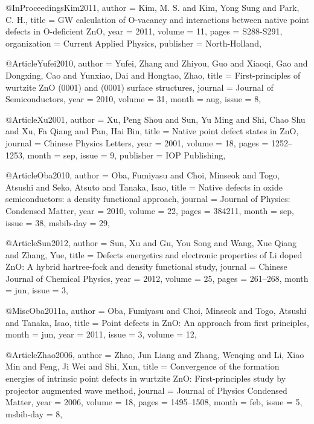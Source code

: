 @InProceedings{Kim2011,
  author       = {Kim, M. S. and Kim, Yong Sung and Park, C. H.},
  title        = {GW calculation of O-vacancy and interactions between native point defects in O-deficient ZnO},
  year         = {2011},
  volume       = {11},
  pages        = {S288-S291},
  organization = {Current Applied Physics},
  publisher    = {North-Holland},
}

@Article{Yufei2010,
  author  = {Yufei, Zhang and Zhiyou, Guo and Xiaoqi, Gao and Dongxing, Cao and Yunxiao, Dai and Hongtao, Zhao},
  title   = {First-principles of wurtzite ZnO (0001) and (0001) surface structures},
  journal = {Journal of Semiconductors},
  year    = {2010},
  volume  = {31},
  month   = aug,
  issue   = {8},
}

@Article{Xu2001,
  author    = {Xu, Peng Shou and Sun, Yu Ming and Shi, Chao Shu and Xu, Fa Qiang and Pan, Hai Bin},
  title     = {Native point defect states in ZnO},
  journal   = {Chinese Physics Letters},
  year      = {2001},
  volume    = {18},
  pages     = {1252--1253},
  month     = sep,
  issue     = {9},
  publisher = {IOP Publishing},
}

@Article{Oba2010,
  author    = {Oba, Fumiyasu and Choi, Minseok and Togo, Atsushi and Seko, Atsuto and Tanaka, Isao},
  title     = {Native defects in oxide semiconductors: a density functional approach},
  journal   = {Journal of Physics: Condensed Matter},
  year      = {2010},
  volume    = {22},
  pages     = {384211},
  month     = sep,
  issue     = {38},
  msbib-day = {29},
}

@Article{Sun2012,
  author  = {Sun, Xu and Gu, You Song and Wang, Xue Qiang and Zhang, Yue},
  title   = {Defects energetics and electronic properties of Li doped ZnO: A hybrid hartree-fock and density functional study},
  journal = {Chinese Journal of Chemical Physics},
  year    = {2012},
  volume  = {25},
  pages   = {261--268},
  month   = jun,
  issue   = {3},
}

@Misc{Oba2011a,
  author = {Oba, Fumiyasu and Choi, Minseok and Togo, Atsushi and Tanaka, Isao},
  title  = {Point defects in ZnO: An approach from first principles},
  month  = jun,
  year   = {2011},
  issue  = {3},
  volume = {12},
}

@Article{Zhao2006,
  author    = {Zhao, Jun Liang and Zhang, Wenqing and Li, Xiao Min and Feng, Ji Wei and Shi, Xun},
  title     = {Convergence of the formation energies of intrinsic point defects in wurtzite ZnO: First-principles study by projector augmented wave method},
  journal   = {Journal of Physics Condensed Matter},
  year      = {2006},
  volume    = {18},
  pages     = {1495--1508},
  month     = feb,
  issue     = {5},
  msbib-day = {8},
}

